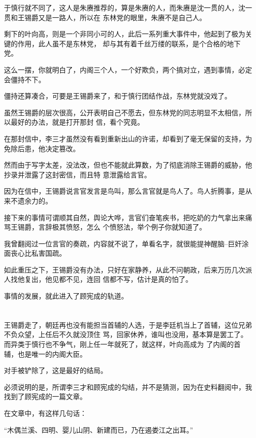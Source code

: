 \documentclass[11pt,a4paper,onecolumn]{article}
\begin{document}
于慎行就不同了，这人是朱赓推荐的，算是朱赓的人，而朱赓是沈一贯的人，沈一贯和王锡爵又是一路人，所以在
东林党的眼里，朱赓不是自己人。

剩下的叶向高，则是一个非同小可的人，此后一系列重大事件中，他起到了极为关键的作用，此人虽不是东林党，
却与其有着千丝万缕的联系，是个合格的地下党。

这么一摆，你就明白了，内阁三个人，一个好欺负，两个搞对立，遇到事情，必定会僵持不下。

僵持还算凑合，可要是王锡爵来了，和于慎行团结作战，东林党就没戏了。

虽然王锡爵的层次很高，公开表明自己不愿去，但东林党的同志明显不太相信，所以最好的办法，就是打开那封
信，看个究竟。

在那封信中，李三才虽然没有看到重新出山的许诺，却看到了毫无保留的支持，为免除后患，他决定篡改。

然而由于写字太差，没法改，但也不能就此算数，为了彻底消除王锡爵的威胁，他抄录并泄露了这封密信，而且特
意泄露给言官。

因为在信中，王锡爵说言官发言是鸟叫，那么言官就是鸟人了。鸟人折腾事，是从来不遗余力的。

接下来的事情可谓顺其自然，舆论大哗，言官们奋笔疾书，把吃奶的力气拿出来痛骂王锡爵，言辞极其愤怒，怎么
个愤怒法，举个例子你就知道了。

我曾翻阅过一位言官的奏疏，内容就不说了，单看名字，就很能提神醒脑--巨奸涂面丧心比私害国疏。

如此重压之下，王锡爵没有办法，只好在家静养，从此不问朝政，后来万历几次派人找他复出，他见都不见，连回
信都不写，估计是真的怕了。

事情的发展，就此进入了顾宪成的轨道。

\section[\thesection]{}

王锡爵走了，朝廷再也没有能担当首辅的人选，于是李廷机当上了首辅，这位兄弟不负众望，上任后不久就没顶住
骂，回家休养，谁叫也没用，基本算是罢工了。而异类于慎行也不争气，刚上任一年就死了，就这样，叶向高成为
了内阁的首辅，也是唯一的内阁大臣。

对手被铲除了，这是最好的结局。

必须说明的是，所谓李三才和顾宪成的勾结，并不是猜测，因为在史料翻阅中，我找到了顾宪成的一篇文章。

在文章中，有这样几句话：

``木偶兰溪、四明、婴儿山阴、新建而已，乃在遏娄江之出耳。''
\end{document}
